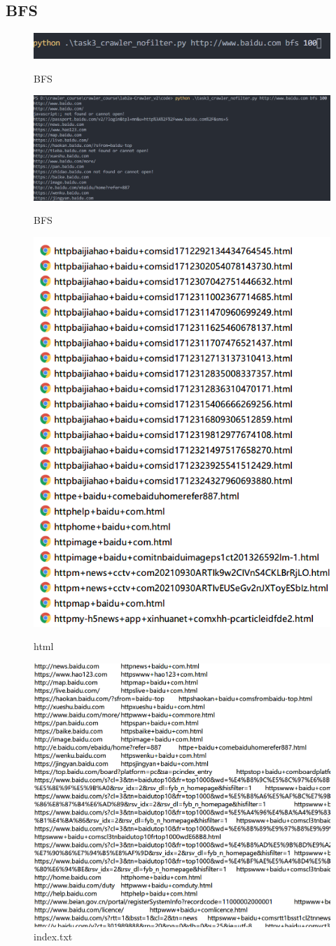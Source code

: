 \documentclass[12pt,a4paper,oneside]{article}
\begin{document}
\subsection{BFS}
\begin{figure}[H] \centering
	\includegraphics[width=0.6\linewidth]{3_1.png}
	 \caption{BFS}
	 \includegraphics[width=0.6\linewidth]{3_2.png}
	 \caption{BFS}
	 \includegraphics[width=0.6\linewidth]{3_3.png}
	 \caption{html}
	 \includegraphics[width=0.6\linewidth]{3_4.png}
	 \caption{index.txt}
\end{figure}
\end{document}
